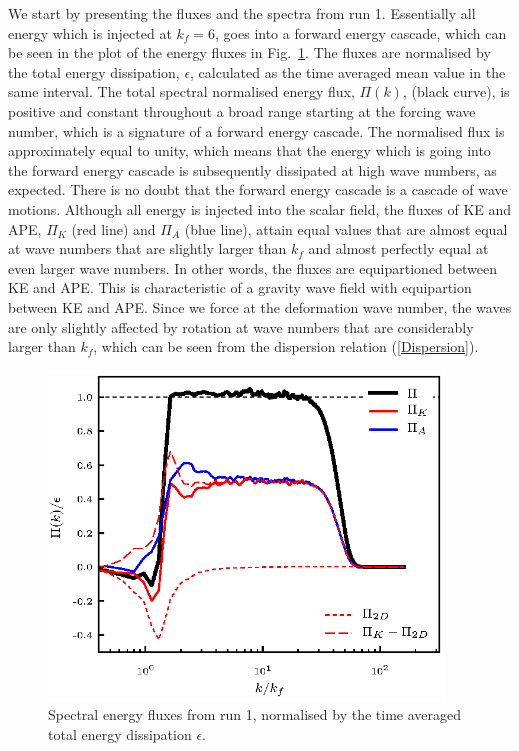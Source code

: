 { We start by presenting the fluxes and the spectra from run 1. }Essentially all energy which is injected at $ k_f  =6 $, goes into a forward energy cascade, which can be seen in the plot of the energy fluxes in Fig.~\ref{F1}. The fluxes are normalised by the total energy dissipation, $ \epsilon $, calculated as the time averaged mean value in the same interval.  The total spectral normalised energy flux, $ \Pi(k) $, (black curve), is positive and constant throughout a broad range starting at the forcing wave number,  which is a signature of a forward energy cascade. The normalised flux is approximately equal to unity, which means that the energy which is going into the forward energy cascade is subsequently dissipated at high wave numbers, as expected. There is no doubt that the forward energy cascade is a cascade of wave motions. Although all energy is injected into the scalar field, the fluxes of KE and APE, $ \Pi_K $ (red line) and $ \Pi_A $ (blue line), attain equal values that are almost equal at wave numbers that are slightly larger than $ k_f $ and almost perfectly equal at even larger wave numbers.  In other words, the fluxes are equipartioned between KE and APE. This is characteristic of a gravity wave field with equipartion between KE and APE. 
Since we force at the deformation wave number, the waves are only slightly affected by rotation at wave numbers that are considerably larger than $ k_f $, which can be seen from the dispersion relation (\ref{Dispersion}). 

\begin{figure}[h]
\centerline{\includegraphics[angle=0,width=10.5cm]{./fig2.eps}}
 \caption{Spectral energy fluxes from run 1, normalised by the time averaged total energy dissipation $ \epsilon $.  }
 \label{F1}
 \end{figure}

